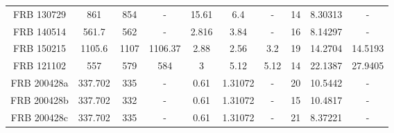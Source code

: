 \begin{table}
\begin{tabular}{cccccccccc}
         FRB 130729  &    861    &       854       &     -     &  15.61   &      6.4       &    -     &     14     &     8.30313      &     -      \\
         FRB 140514  &   561.7   &       562       &     -     &  2.816   &      3.84      &    -     &     16     &     8.14297      &     -      \\
         FRB 150215  &  1105.6   &      1107       &  1106.37  &   2.88   &      2.56      &   3.2    &     19     &     14.2704      &  14.5193   \\
         FRB 121102  &    557    &       579       &    584    &    3     &      5.12      &   5.12   &     14     &     22.1387      &  27.9405   \\
         FRB 200428a &  337.702  &       335       &     -     &   0.61   &    1.31072     &    -     &     20     &     10.5442      &     -      \\
         FRB 200428b &  337.702  &       332       &     -     &   0.61   &    1.31072     &    -     &     15     &     10.4817      &     -      \\
         FRB 200428c &  337.702  &       335       &     -     &   0.61   &    1.31072     &    -     &     21     &     8.37221      &     -      \\
        \hline
    \end{tabular}
    \label{tab:frbres}
\end{table}